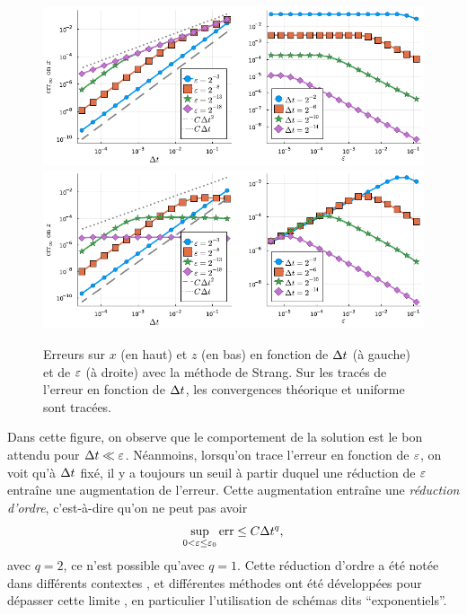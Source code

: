\begin{figure}
    \centering
    \includegraphics[width=\textwidth]{./Presentation/strang_err_x.pdf}
    \includegraphics[width=\textwidth]{./Presentation/strang_err_z.pdf}
    \caption{Erreurs sur $x$ (en haut) et $z$ (en bas) en fonction de $\Delta t$ (à gauche) et de $\varepsilon$ (à droite) avec la méthode de Strang. Sur les tracés de l'erreur en fonction de $\Delta t$, les convergences théorique et uniforme sont tracées.}
    \label{sec:intro:fig:strang}
\end{figure}

Dans cette figure, on observe que le comportement de la solution est le bon attendu pour $\Delta t \ll \varepsilon$. Néanmoins, lorsqu'on trace l'erreur en fonction de $\varepsilon$, on voit qu'à $\Delta t$ fixé, il y a toujours un seuil à partir duquel une réduction de $\varepsilon$ entraîne une augmentation de l'erreur. Cette augmentation entraîne une \textit{réduction d'ordre}, c'est-à-dire qu'on ne peut pas avoir
\begin{equation*}
    \sup_{0 < \varepsilon \leq \varepsilon_0} \operatorname{err} \leq C \Delta t^q ,
\end{equation*}
avec $q = 2$, ce n'est possible qu'avec $q = 1$. Cette réduction d'ordre a été notée dans différents contextes \cite{sportisse.2000.analysis,faou.2015.analysis}, et différentes méthodes ont été développées pour dépasser cette limite \cite{einkemmer.2015.overcoming,cano.2017.avoiding,bertoli.2020.strang}, en particulier l'utilisation de schémas dits \enquote{exponentiels}. 

